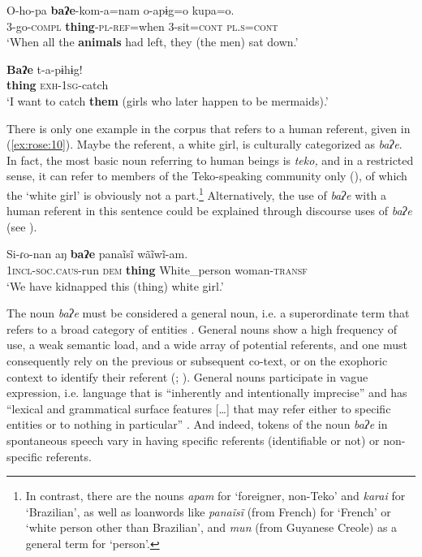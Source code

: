\documentclass[output=paper]{langscibook}
\begin{document}
\ea \label{ex:rose:8}
\gll O-ho-pa  \textbf{baʔe}{}-kom-a=nam  o-apɨg=o  kupa=o.\\
3-go-\textsc{compl}  \textbf{thing}{}-\textsc{pl}{}-\textsc{ref}=when  3-sit=\textsc{cont}  \textsc{pl}.\textsc{s}=\textsc{cont}\\
\glt ‘When all the \textbf{animals} had left, they (the men) sat down.’ 
\z 

\ea \label{ex:rose:9}
\gll \textbf{Baʔe}   t-a-pɨhɨg!\\
\textbf{thing}   \textsc{exh-1sg-}catch\\
\glt ‘I want to catch \textbf{them} (girls who later happen to be mermaids).’  
\z 

There is only one example in the corpus that refers to a human referent, given in (\ref{ex:rose:10}). Maybe the referent, a white girl, is culturally categorized as \textit{baʔe}. In fact, the most basic noun referring to human beings is \textit{teko, } and in a restricted sense, it can refer to members of the Teko-speaking community only (\citealt[101]{CachineCachine2020}), of which the ‘white girl’ is obviously not a part.\footnote{In contrast, there are the nouns \textit{apam} for ‘foreigner, non-Teko’ and \textit{karai} for ‘Brazilian’, as well as loanwords like \textit{panaĩsĩ} (from French) for ‘French’ or ‘white person other than Brazilian’, and \textit{mun} (from Guyanese Creole) as a general term for ‘person’.} Alternatively, the use of \textit{baʔe} with a human referent in this sentence could be explained through discourse uses of \textit{baʔe} (see ).

\ea \label{ex:rose:10}
\gll Si-ɾo-nan  aŋ  \textbf{baʔe}  panaĩsĩ  wãĩwĩ-am.\\
\textsc{1incl-soc.caus-}run  \textsc{dem}  \textbf{thing}  White\_person  woman-\textsc{transf}\\
\glt ‘We have kidnapped this (thing) white girl.’ 
\z 

The noun \textit{baʔe} must be considered a general noun, i.e. a superordinate term that refers to a broad category of entities \citep{Cutting2019}. General nouns show a high frequency of use, a weak semantic load, and a wide array of potential referents, and one must consequently rely on the previous or subsequent co-text, or on the exophoric context to identify their referent (\citealt{HallidayHalliday2013}; \citealt{AdlerAdler2018}). General nouns participate in vague expression, i.e. language that is “inherently and intentionally imprecise” and has “lexical and grammatical surface features […] that may refer either to specific entities or to nothing in particular” \citep[4]{Cutting2007}. And indeed, tokens of the noun \textit{baʔe} in spontaneous speech vary in having specific referents (identifiable or not) or non-specific referents.
\end{document}

